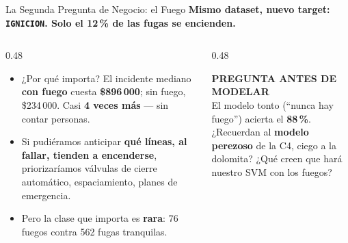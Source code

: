 \documentclass[aspectratio=169, 11pt]{beamer}
\begin{document}
\begin{frame}[shrink=8]{La Segunda Pregunta de Negocio: el Fuego}
  \vspace{-4pt}
  {\small\color{arcaDark}\bfseries
    Mismo dataset, nuevo target: \texttt{IGNICION}. Solo el 12\,\% de las fugas se encienden.}

  \vspace{8pt}
  \begin{columns}[T]
    \begin{column}{0.48\textwidth}
      {\footnotesize\color{textMuted}
      \begin{itemize}\setlength{\itemsep}{5pt}
        \item[{\color{arcaRed}\scriptsize\faDollarSign}]
          ¿Por qué importa? El incidente mediano \textbf{con fuego}
          cuesta \textbf{\$896\,000}; sin fuego, \$234\,000.
          Casi \textbf{4 veces más} --- sin contar personas.
        \item[{\color{arcaRed}\scriptsize\faArrowRight}]
          Si pudiéramos anticipar \textbf{qué líneas, al fallar,
          tienden a encenderse}, priorizaríamos válvulas de cierre
          automático, espaciamiento, planes de emergencia.
        \item[{\color{arcaRed}\scriptsize\faExclamationTriangle}]
          Pero la clase que importa es \textbf{rara}: 76 fuegos
          contra 562 fugas tranquilas.
      \end{itemize}
      }
    \end{column}
    \begin{column}{0.48\textwidth}
      \begin{tcolorbox}[colback=arcaGray, colframe=arcaRed, boxrule=0pt, leftrule=3pt,
        arc=3pt, left=6pt, right=6pt, top=5pt, bottom=5pt]
        {\scriptsize\color{arcaDark}\bfseries\faQuestion\hspace{4pt}PREGUNTA ANTES DE MODELAR}\\[4pt]
        {\scriptsize\color{textMuted}
          El modelo tonto (``nunca hay fuego'') acierta el
          \textbf{88\,\%}.\\[3pt]
          ¿Recuerdan al \textbf{modelo perezoso} de la C4, ciego a la
          dolomita? ¿Qué creen que hará nuestro SVM con
          los fuegos?}
      \end{tcolorbox}
    \end{column}
  \end{columns}
\end{frame}
\end{document}
